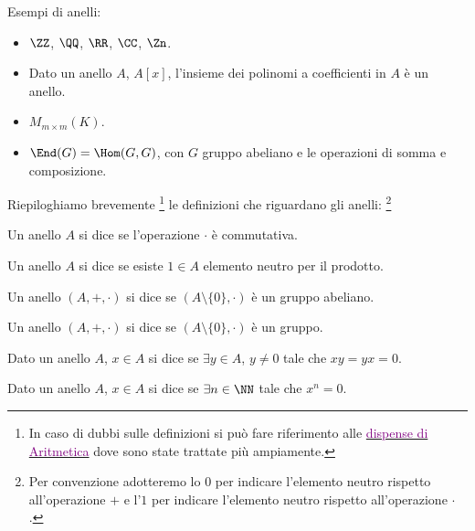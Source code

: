 \documentclass[11pt]{scrartcl}
\begin{document}
\begin{example}[Anelli]
    Esempi di anelli:
    \begin{itemize}
        \item $\ZZ$, $\QQ$, $\RR$, $\CC$, $\Zn$.
        \item Dato un anello $A$, $A[x]$, l'insieme dei polinomi a coefficienti in $A$ è un anello.
        \item $M_{m \times m}(K)$.
        \item $\End(G) = \Hom(G,G)$, con $G$ gruppo abeliano e le operazioni di somma e composizione. 
    \end{itemize}
\end{example}

Riepiloghiamo brevemente \footnote{In caso di dubbi sulle definizioni si può fare riferimento alle \href{https://github.com/diego-unipi/Appunti-Aritmetica}{\textcolor{purple}{dispense di Aritmetica}}
dove sono state trattate più ampiamente.} le definizioni che riguardano gli anelli: \footnote{Per convenzione adotteremo lo $0$ per indicare l'elemento neutro rispetto all'operazione $+$ e l'$1$ per indicare l'elemento neutro rispetto all'operazione $\cdot$.}

\begin{definition}
    Un anello $A$ si dice  se l'operazione $\cdot$ è commutativa.
\end{definition}

\begin{definition}
    Un anello $A$ si dice  se esiste $1 \in A$ elemento neutro per il prodotto.
\end{definition}

\begin{definition}
    Un anello $(A,+,\cdot)$ si dice  se $(A\setminus\{0\},\cdot)$ è un gruppo abeliano.
\end{definition}

\begin{definition}
    Un anello $(A,+,\cdot)$ si dice  se $(A\setminus\{0\},\cdot)$ è un gruppo.
\end{definition}

\begin{definition}
    Dato un anello $A$, $x \in A$ si dice  se $\exists y \in A$, $y \ne 0$ tale che $xy=yx=0$.
\end{definition}

\begin{definition}
    Dato un anello $A$, $x \in A$ si dice  se $\exists n \in \NN$ tale che $x^n = 0$.
\end{definition}
\end{document}
